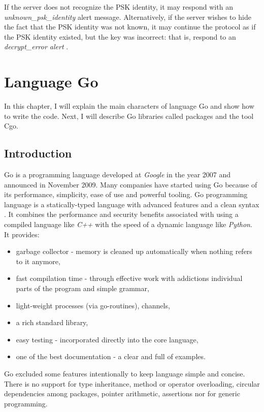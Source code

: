 \documentclass[
  twoside, 12pt, 
  printed, %
  notable,   %
  lof,     %
  lot,     %
]{fithesis3}
\begin{document}
If the server does not recognize the PSK identity, it may respond with an 
\textit{unknown\_psk\_identity} alert message.  Alternatively, if the server wishes to hide 
the fact that the PSK identity was not known, it may continue the protocol as if the PSK 
identity existed, but the key was incorrect: that is, respond to an \textit{decrypt\_error 
alert} \cite{eronen2005pre}. 

\chapter{Language Go}\label{go}
In this chapter, I will explain the main characters of language Go and show how to write the 
code. Next, I will describe Go libraries called packages and the tool Cgo.

\section{Introduction}
Go is a programming language developed at \textit{Google} in the year 2007 and announced in 
November 2009. Many companies have started using Go because of its performance, simplicity, 
ease of use and powerful tooling. Go programming language is a statically-typed language with 
advanced features and a clean syntax \cite{doxsey2016introducing}. It combines the performance 
and security benefits associated with using a compiled language like \textit{C++} with the 
speed of a dynamic language like \textit{Python}. It provides:
\vskip0.1in
\begin{itemize}[leftmargin=2em,rightmargin=1em,itemsep=0.75\parskip,parsep=0em,topsep=0em,partopsep=0em]
\item garbage collector - memory is cleaned up automatically when nothing refers to it 
anymore,
\item fast compilation time - through effective work with addictions individual parts of the 
program and simple grammar,
\item light-weight processes (via go-routines), channels,
\item a rich standard library,
\item easy testing - incorporated directly into the core language,
\item one of the best documentation - a clear and full of examples.
\end{itemize}
\vskip0.1in

Go excluded some features intentionally to keep language simple and concise. There is no 
support for type inheritance, method or operator overloading, circular dependencies among 
packages, pointer arithmetic, assertions nor for generic programming.
\nocite{wiki-go}
\nocite{doxsey2016introducing}
\end{document}
